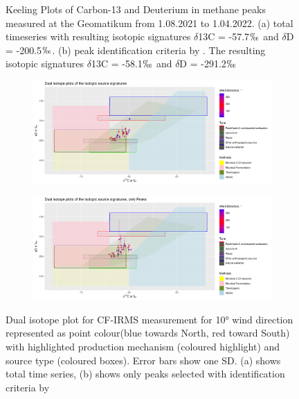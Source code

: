 \begin{figure}[!htb]
\caption[Keeling Plot for CH$_4$ peaks in CR-IRMS measurement with peak identification criteria from literature]{Keeling Plots of Carbon-13 and Deuterium in methane peaks measured at the Geomatikum from 1.08.2021 to 1.04.2022. (a) total timeseries with resulting isotopic signatures $\delta$13C = -57.7$\permil$ and $\delta$D = -200.5$\permil$. (b) peak identification criteria by \cite{Menoud.2021}. The resulting isotopic signatures $\delta$13C = -58.1$\permil$ and $\delta$D = -291.2$\permil$}
\label{KeelingPaper}
\end{figure}

\begin{figure}[htbp]
\centering
\begin{subfigure}[b]{1\textwidth}
   \includegraphics[width=1\linewidth]{figures/Appendix/Keeling/12_Keeling_Total_Wind_paper_peaks.png}
   \caption{}
   \label{DualIsotiotopePaperTotal} 
\end{subfigure}
\begin{subfigure}[b]{1\textwidth}
   \includegraphics[width=1\linewidth]{figures/Appendix/Keeling/12_Keeling_Peaks_Wind_paper_peaks.png}
   \caption{}
   \label{DualIsotiotopePaperPeaks}
\end{subfigure}
\caption[Dual isotope plot with Literature peak identification criteria]{Dual isotope plot for CF-IRMS measurement for 10° wind direction represented as point colour(blue towards North, red toward South) with highlighted production mechanism (coloured highlight) and source type (coloured boxes). Error bars show one SD. (a) shows total time series, (b) shows only peaks selected with identification criteria by \cite{Menoud.2021}}
\label{DualIsotiotopePlotsAppendix}
\end{figure}


